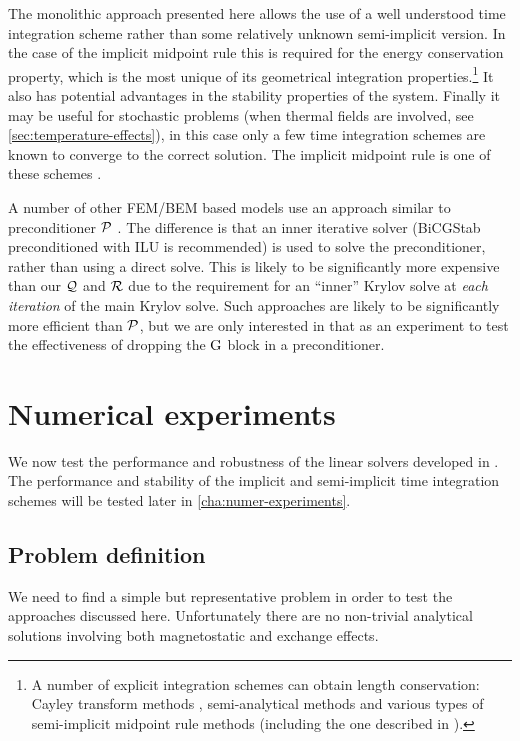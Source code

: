 The monolithic approach presented here allows the use of a well understood time integration scheme rather than some relatively unknown semi-implicit version.
In the case of the implicit midpoint rule this is required for the energy conservation property, which is the most unique of its geometrical integration properties.\footnote{A number of explicit integration schemes can obtain length conservation: Cayley transform methods \cite{Lewis2003}, semi-analytical methods \cite{Wiele2010} and various types of semi-implicit midpoint rule methods \cite{Spargo2003} \cite{Mentink2010} (including the one described in ).}
It also has potential advantages in the stability properties of the system.
Finally it may be useful for stochastic problems (\ie when thermal fields are involved, see \cref{sec:temperature-effects}), in this case only a few time integration schemes are known to converge to the correct solution.
The implicit midpoint rule is one of these schemes \cite{DAquino2006}.


A number of other FEM/BEM based models use an approach similar to preconditioner $\mathcal{P}$ \cite{Suess2002}.
The difference is that an inner iterative solver (BiCGStab preconditioned with ILU is recommended) is used to solve the preconditioner, rather than using a direct solve.
This is likely to be significantly more expensive than our $\mathcal{Q}$ and $\mathcal{R}$ due to the requirement for an ``inner'' Krylov solve at \emph{each iteration} of the main Krylov solve.
Such approaches are likely to be significantly more efficient than $\mathcal{P}$, but we are only interested in that as an experiment to test the effectiveness of dropping the $\mathrm{G}$ block in a preconditioner.


\section{Numerical experiments}
\label{sec:numer-exper-fem-bem-systems}

We now test the performance and robustness of the linear solvers developed in .
The performance and stability of the implicit and semi-implicit time integration schemes will be tested later in \cref{cha:numer-experiments}.


\subsection{Problem definition}

We need to find a simple but representative problem in order to test the approaches discussed here.
Unfortunately there are no non-trivial analytical solutions involving both magnetostatic and exchange effects.

